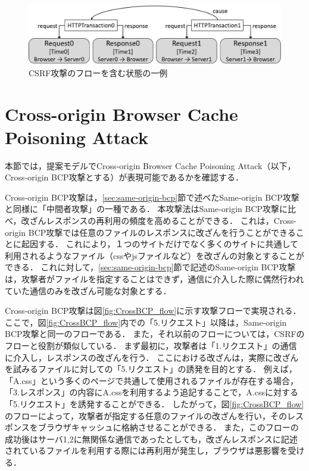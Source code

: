 \documentclass[12pt,a4paper]{jbook}
\begin{document}
\begin{figure}[htb]
\centering
\includegraphics[width=450pt]{./fig/CSRF_alloy.eps}
\caption{CSRF攻撃のフローを含む状態の一例}
\label{fig:CSRF_alloy}
\end{figure}

\section{Cross-origin Browser Cache Poisoning Attack}
本節では，提案モデルでCross-origin Browser Cache Poisoning Attack\cite{bcpattack}（以下，Cross-origin BCP攻撃とする）が表現可能であるかを確認する．

Cross-origin BCP攻撃は，\ref{sec:same-origin-bcp}節で述べたSame-origin BCP攻撃と同様に「中間者攻撃」の一種である．
本攻撃法はSame-origin BCP攻撃に比べ，改ざんレスポンスの再利用の頻度を高めることができる．
これは，Cross-origin BCP攻撃では任意のファイルのレスポンスに改ざんを行うことができることに起因する．
これにより，１つのサイトだけでなく多くのサイトに共通して利用されるようなファイル（cssやjsファイルなど）を改ざんの対象とすることができる．
これに対して，\ref{sec:same-origin-bcp}節で記述のSame-origin BCP攻撃は，攻撃者がファイルを指定することはできず，通信に介入した際に偶然行われていた通信のみを改ざん可能な対象とする．

Cross-origin BCP攻撃は図\ref{fig:CrossBCP_flow}に示す攻撃フローで実現される．
ここで，図\ref{fig:CrossBCP_flow}内での「5.リクエスト」以降は，Same-origin BCP攻撃と同一のフローである．
また，それ以前のフローについては，CSRFのフローと役割が類似している．
まず最初に，攻撃者は「1.リクエスト」の通信に介入し，レスポンスの改ざんを行う．
ここにおける改ざんは，実際に改ざんを試みるファイルに対しての「5.リクエスト」の誘発を目的とする．
例えば，「A.css」という多くのページで共通して使用されるファイルが存在する場合，「3.レスポンス」の内容にA.cssを利用するよう追記することで，A.cssに対する「5.リクエスト」を誘発することができる．
したがって，図\ref{fig:CrossBCP_flow}のフローによって，攻撃者が指定する任意のファイルの改ざんを行い，そのレスポンスをブラウザキャッシュに格納させることができる．
また，このフローの成功後はサーバ1,2に無関係な通信であったとしても，改ざんレスポンスに記述されているファイルを利用する際には再利用が発生し，ブラウザは悪影響を受ける．
\end{document}
